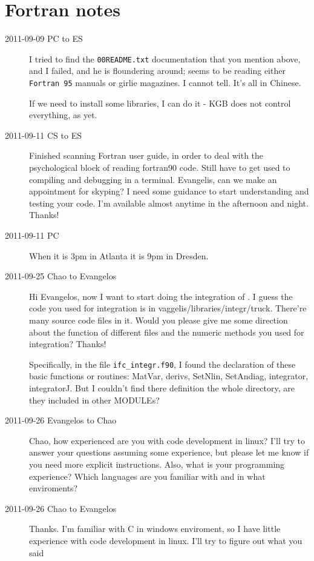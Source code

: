 \section{Fortran notes}
\label{s:fortran}

\begin{description}

\item[2011-09-09 PC to ES]
I tried to find the \texttt{00README.txt} documentation that you mention
above, and I failed, and he is floundering around; seems to be reading
either \texttt{Fortran 95} manuals or girlie magazines. I cannot tell.
It's all in Chinese.

If we need to install some libraries, I can do it - KGB does not control
everything, as yet.


\item[2011-09-11 CS to ES] Finished scanning Fortran user guide, in order
to deal with the psychological block of reading fortran90 code. Still
have to get used to compiling and debugging in a terminal. Evangelis, can
we make an appointment for skyping? I need some guidance to start
understanding and testing your code. I'm available almost anytime in the
afternoon and night. Thanks!

\item[2011-09-11 PC] When it is 3pm in Atlanta it is 9pm in Dresden.

\item[2011-09-25 Chao to Evangelos]
Hi Evangelos, now I want to start doing the integration of \KSe. I guess the code you used for integration is in vaggelis/libraries/integr/truck. There're many source code files in it. Would you please give me some direction about the function of different files and the numeric methods you used for integration? Thanks!

Specifically, in the file \texttt{ifc\_integr.f90}, I found the declaration of these basic functions or routines: MatVar, derivs, SetNlin, SetAndiag, integrator, integratorJ. But I couldn't find there definition the whole directory, are they included in other MODULEs?

\item[2011-09-26 Evangelos to Chao] Chao, how experienced are you with
code development in linux? I'll try to answer your questions assuming some
experience, but please let me know if you need more explicit instructions. 
Also, what is your programming experience? Which languages are you familiar
with and in what enviroments?

\item[2011-09-26 Chao to Evangelos] Thanks. I'm familiar with C in windows enviroment, so I have little experience with code development in linux. I'll try to figure out what you said 


\end{description}
